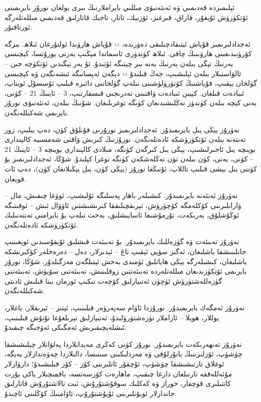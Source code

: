 \documentclass[a4paper]{article}
\begin{document}
ئېلىمىزدە قەدىمىي ۋە ئەنئەنىۋى مىللىي بايراملارنىڭ بىرى بولغان نورۇز بايرىمىنى ئۆتكۈزۈش ئۇيغۇر، قازاق، قىرغىز، ئۆزبېك، تاتار، تاجىك قاتارلىق قەدىمىي مىللەتلەرگە ئورتاقتۇر.



ئەجدادلىرىمىز قۇياش ئېتىقادچىلىقى دەۋرىدە، ‹‹ قۇياش ھارۋىدا ئولتۇرغان ئىلاھ. بىزگە كۆرۈنىدىغىنى ھارۋىنىڭ چاقى. ئىلاھ كۈندۈزى ئاسماندا مېڭىپ يەرنى يورۇتسا، كېچىسى يەرنىڭ تېگى بىلەن يەرنىڭ يەنە بىر چېتىگە ئۆتىدۇ. ئۇ يەر تېگىدىن ئۆتكۈچە جىن – ئالۋاستىلار بىلەن ئېلىشىپ، جەڭ قىلىدۇ ›› دېگەن ئەپسانىگە ئىشەنگەن ۋە كېچىسى گۈلخان يېقىپ، قۇياشنىڭ كۆتۈرۈلۈشىنى تىلەپ گۈلخاننى دائىرە قىلىپ ئۇسسۇل ئويناپ، ئىبادەت قىلغان. كېيىن ئىبادەت ۋاقتىنى تەدرىجىي قىسقارتىپ، 3 – ئاينىڭ 21 – كۈنى، يەنى كېچە بىلەن كۈندۈز تەڭلىشىدىغان كۈنگە توغرىلىغان. شۇنىڭ بىلەن، ئەنئەنىۋى نورۇز بايرىمى شەكىللەنگەن.



نەۋرۇز يېڭى يىل بايرىمىدۇر. ئەجدادلىرىمىز نورۇزنى قۇتلۇق كۈن، دەپ بىلىپ، زور تەنتەنە بىلەن ئۆتكۈزۈشكە ئادەتلەنگەن. نورۇزنىڭ كىرىش ۋاقتى شەمسىيە كالېندارى بويىچە يىل ئاخىرلىشىپ، يېڭى يىل كىرگەن كۈنگە، مىلادى كالېندارى بويىچە 3 – ئاينىڭ 21 – كۈنى، يەنى، كۈن بىلەن تۈن تەڭلەشكەن كۈنگە توغرا كېلىدۇ. شۇڭا، ئەجدادلىرىمىز بۇ كۈننى يىل بېشى قىلىپ تاللاپ، ئۇنىڭغا نورۇز (يېڭى كۈن، يىل يېڭىلانغان كۈن)، دەپ ئات قويغان.



نەۋرۇز ئەنئەنە بايرىمىدۇر. كىشىلەر باھار پەسلىگە ئۇلىشىپ، ئوۋغا چىقىش، مال – ۋارانلىرىنى كۆكلەمگە كۆچۈرۈش، تېرىقچىلىققا كىرىشىشتىن ئاۋۋال ئىش – ئوقىتىگە ئوڭۇشلۇق، بەرىكەت، تۇرمۇشىغا ئاسايىشلىق، بەخت تىلەپ بۇ بايرامنى تەنتەنىلىك ئۆتكۈزۈشكە ئادەتلەنگەن.



نەۋرۇز تەبىئەت ۋە گۈزەللىك بايرىمىدۇر. بۇ تەبىئەت قىشلىق ئۇيقۇسىدىن ئويغىنىپ جانلىنىشقا باشلىغان، ئەگىز سۈيى ئېقىپ تاغ – ئېدىرلار، دەل – دەرەخلەر كۆكىرىشكە باشلىغان، كىشىلەرگە يېڭى ھاياتلىق ئۈمىدى بەخش ئېتىلگەن مەزگىلدۇر. شۇڭا، نورۇز بايرىمى ئۆتكۈزىدىغان مىللەتلەردە تەبىئەتتىن زوقلىنىش، تەبىئەتنى سۆيۈش، تەبىئەتنى گۈزەللەشتۈرۈش ئۈچۈن ئەتىيازلىق كۆچەت تىكىپ ئورمان بىنا قىلىش ئادىتى شەكىللەنگەن.



نەۋرۇز ئەمگەك بايرىمىدۇر. نورۇزدا ئاۋام سەپەرۋەر قىلىنىپ، ئېتىز – ئېرىقلار، باغلار، يوللار، ھويلا – ئاراملار تۈزەشتۈرۈلىدۇ، ئەتىيازلىق تېرىلغۇغا تۇتۇش قىلىنىپ، ئىشلەپچىقىرىش ئەمگىكى ئەۋجىگە چىقىدۇ.



نەۋرۇز تەنھەرىكەت بايرىمىدۇر. نورۇز كۈنى كەڭرى مەيدانلاردا پەلۋانلار چېلىشىشقا چۈشۈپ، ئۆزلىرىنىڭ باتۇرلۇقى ۋە مەردلىكىنى سىنىسا، دالىلاردا چەۋەندازلار بەيگە، ئوغلاق تارتىشىشقا چۈشۈپ، ئۇچقۇر ئاتلىرىنى كۆز – كۆز قىلىشىدۇ؛ دارۋازلار مۇئەللەققە تارتىلغان دارغا چىقىپ، ماھارەت كۆرسەتسە، باقمىچىلار ياكى يۇرت كاتتىلىرى قوچقار، خوراز ۋە كەكلىك سوقۇشتۇرۇش، ئىت تالاشتۇرۇش قاتارلىق جاندارلار ئويۇنلىرىنى ئۇيۇشتۇرۇپ، ئاۋامنىڭ كۆڭلىنى ئاچىدۇ.
\end{document}
